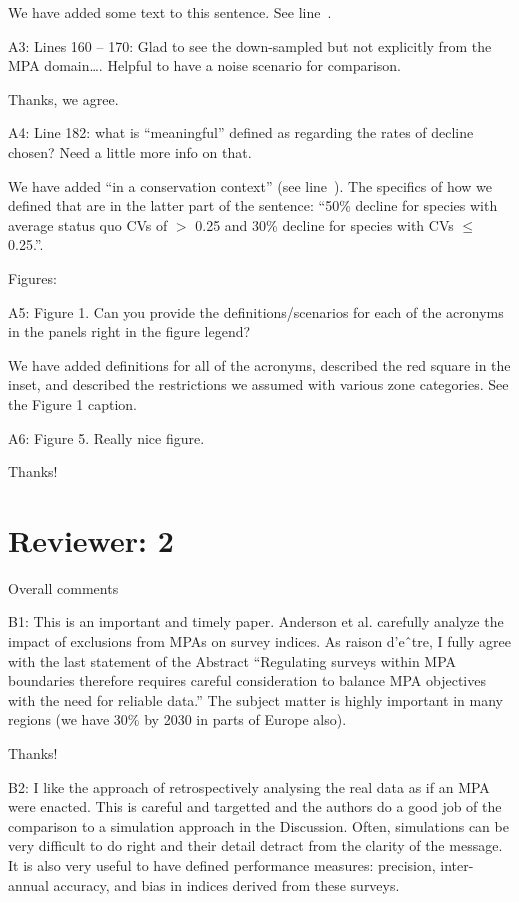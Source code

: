 \documentclass[12pt]{article}
\newcommand{\rev}[1]{{\color{niceblue} #1}}
\newcommand{\lr}[1]{line~\lineref{#1}}
\begin{document}
We have added some text to this sentence. See \lr{A2}.

\rev{A3: Lines 160 – 170: Glad to see the down-sampled but not explicitly from the MPA domain…. Helpful to have a noise scenario for comparison.}

Thanks, we agree.

\rev{A4: Line 182: what is ``meaningful'' defined as regarding the rates of decline chosen? Need a little more info on that.}

We have added ``in a conservation context'' (see \lr{A4}). The specifics of how we defined that are in the latter part of the sentence: ``50\% decline for species with average status quo CVs of $>$ 0.25 and 30\% decline for species with CVs $\le$ 0.25.''.

\rev{Figures:}

\rev{A5: Figure 1. Can you provide the definitions/scenarios for each of the acronyms in the panels right in the figure legend?}

We have added definitions for all of the acronyms, described the red square in the inset, and described the restrictions we assumed with various zone categories. See the Figure 1 caption.

\rev{A6: Figure 5. Really nice figure.}

Thanks!

\section{Reviewer: 2}

\rev{Overall comments}

\rev{B1: This is an important and timely paper. Anderson et al. carefully analyze the impact of exclusions from MPAs on survey indices. As raison d’eˆtre, I fully agree with the last statement of the Abstract “Regulating surveys within MPA boundaries therefore requires careful consideration to balance MPA objectives with the need for reliable data.” The subject matter is highly important in many regions (we have 30\% by 2030 in parts of Europe also).}

Thanks!

\rev{B2: I like the approach of retrospectively analysing the real data as if an MPA were enacted. This is careful and targetted and the authors do a good job of the comparison to a simulation approach in the Discussion. Often, simulations can be very difficult to do right and their detail detract from the clarity of the message. It is also very useful to have defined performance measures: precision, inter-annual accuracy, and bias in indices derived from these surveys.}
\end{document}
